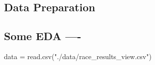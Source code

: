 \documentclass[
]{article}
\newenvironment{Shaded}{\begin{snugshade}}{\end{snugshade}}
\newcommand{\FunctionTok}[1]{\textcolor[rgb]{0.00,0.00,0.00}{#1}}
\newcommand{\NormalTok}[1]{#1}
\newcommand{\OtherTok}[1]{\textcolor[rgb]{0.56,0.35,0.01}{#1}}
\newcommand{\StringTok}[1]{\textcolor[rgb]{0.31,0.60,0.02}{#1}}
\begin{document}
\hypertarget{data-preparation}{%
\subsection{Data Preparation}\label{data-preparation}}

\hypertarget{some-eda--}{%
\subsection{Some EDA ----}\label{some-eda--}}

\begin{Shaded}
\begin{Highlighting}[]
\NormalTok{data }\OtherTok{=} \FunctionTok{read.csv}\NormalTok{(}\StringTok{"./data/race\_results\_view.csv"}\NormalTok{)}
\end{Highlighting}
\end{Shaded}
\end{document}
